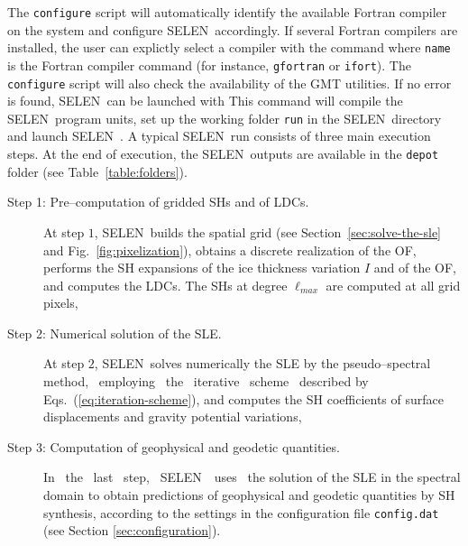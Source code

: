 \documentclass[11pt,fleqn,a4paper,titlepage]{article}
\newcommand\selen{\textsf{SELEN~}}
\begin{document}
{\color{red}{\normalsize\begin{verbatim} 
$ configure
\end{verbatim} }}
\vspace{0.1cm}
\noindent The \texttt{configure} script will automatically identify the available Fortran compiler on the system and configure \selen accordingly.  If several Fortran compilers are installed, the user can explictly select a compiler with the command 
{\color{red}{\normalsize\begin{verbatim} 
$ configure FC=name
\end{verbatim} }}
\vspace{0.1cm}
\noindent where \texttt{name} is the Fortran compiler command (for instance, \texttt{gfortran} or \texttt{ifort}).  The \texttt{configure} script will also check the availability of the GMT utilities. If no error is found, \selen can be  launched with
{\color{red}{\normalsize\begin{verbatim} 
$ make run
\end{verbatim} }}
\vspace{0.1cm}
\noindent This command will compile the \selen program units, set up the working folder \texttt{run} in the \selen directory and launch \selen.  A typical \selen run consists of three main execution steps. At the end of execution, the \selen outputs are 
available in the \texttt{depot} folder (see Table~\ref{table:folders}). 
\begin{description}
\item[Step 1: Pre--computation of gridded SHs and of LDCs.] At step $1$, \selen builds the spatial 
grid (see Section~\ref{sec:solve-the-sle} and Fig.~\ref{fig:pixelization}), obtains a discrete 
realization of the OF, performs the SH expansions of the ice thickness variation $I$ and of the OF, 
and computes the LDCs. The SHs at degree $\ell_{max}$ are computed at all grid pixels, 
\item[Step 2: Numerical solution of the SLE.] At step $2$, \selen solves numerically the SLE 
by the pseudo--spectral method, ~employing ~the ~iterative ~scheme ~described by Eqs.~(\ref{eq:iteration-scheme}), 
and computes the SH coefficients of surface displacements and gravity potential variations, 
\item[Step 3: Computation of geophysical and geodetic quantities.] In ~the ~last ~step, ~\selen ~uses ~the solution of the SLE in the spectral domain to obtain predictions of geophysical and geodetic quantities by SH synthesis, according to the settings in the configuration file \texttt{config.dat}
(see Section \ref{sec:configuration}). 
\end{description}
\end{document}
